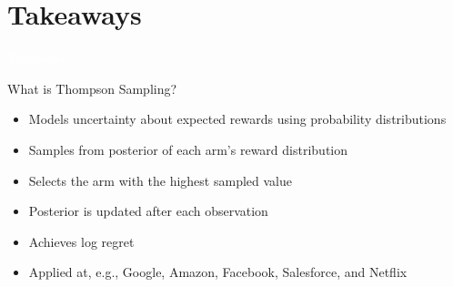 \documentclass[11pt,table]{beamer}
\begin{document}
\section{Takeaways}
{
\begin{frame}
\centering
\Huge
\textcolor{white}{Takeaways}
\thispagestyle{empty}
\end{frame}
}

\begin{frame}{What is Thompson Sampling?}

\begin{itemize}
    \item Models uncertainty about expected rewards using probability distributions
    \item Samples from posterior of each arm’s reward distribution
		\item Selects the arm with the highest sampled value
    \item Posterior is updated after each observation
    \item Achieves log regret
		\item Applied at, e.g., Google, Amazon, Facebook, Salesforce, and Netflix \pause
		\citep[e.g.,][]{Hill_2017,Scott2015,Agarwal2014,Chapelle2011,Scott2010,Graepel2010}
\end{itemize}
\end{frame}
\end{document}
